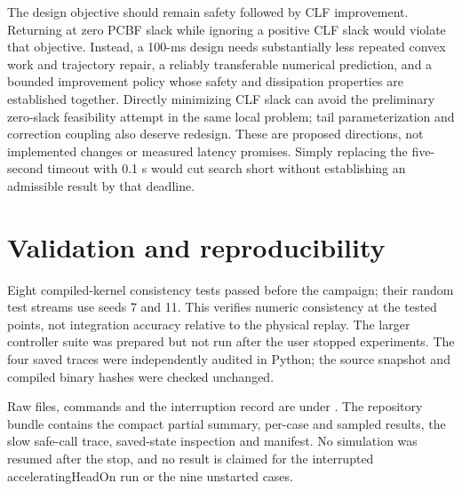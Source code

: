 \documentclass[11pt]{article}
\begin{document}
The design objective should remain safety followed by CLF improvement.
Returning at zero PCBF slack while ignoring a positive CLF slack would violate
that objective. Instead, a 100-ms design needs substantially less repeated
convex work and trajectory repair, a reliably transferable numerical
prediction, and a bounded improvement policy whose safety and dissipation
properties are established together. Directly minimizing CLF slack can avoid
the preliminary zero-slack feasibility attempt in the same local problem;
tail parameterization and correction coupling also deserve redesign. These
are proposed directions, not implemented changes or measured latency promises.
Simply replacing the five-second timeout with 0.1 s would cut search short
without establishing an admissible result by that deadline.

\section{Validation and reproducibility}
Eight compiled-kernel consistency tests passed before the campaign; their
random test streams use seeds 7 and 11. This verifies numeric consistency at
the tested points, not integration accuracy relative to the physical replay.
The larger controller suite was prepared but not run after the user stopped
experiments. The four saved traces were independently audited in Python;
the source snapshot and compiled binary hashes were checked unchanged.

Raw files, commands and the interruption record are under
.
The repository bundle contains the compact partial summary, per-case and
sampled results, the slow safe-call trace, saved-state inspection and manifest.
No simulation was resumed after the stop, and no result is claimed for the
interrupted acceleratingHeadOn run or the nine unstarted cases.
\end{document}
